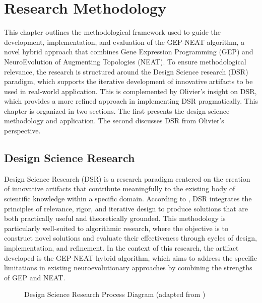 \chapter{Research Methodology}\label{chapter:research_methodology}
This chapter outlines the methodological framework used to guide the development, implementation, and evaluation of the GEP-NEAT algorithm, a novel hybrid approach that combines Gene Expression Programming (GEP) and NeuroEvolution of Augmenting Topologies (NEAT). To ensure methodological relevance, the research is structured around the Design Science research (DSR) paradigm, which supports the iterative development of innovative artifacts to be used in real-world application. This is complemented by Olivier's insight on DSR, which provides a more refined approach in implementing DSR pragmatically. This chapter is organized in two sections. The first presents the design science methodology and application. The second discusses DSR from Olivier's perspective.

\section{Design Science Research}
Design Science Research (DSR) is a research paradigm centered on the creation of innovative artifacts that contribute meaningfully to the existing body of scientific knowledge within a specific domain. According to \cite{hevner2004design}, DSR integrates the principles of relevance, rigor, and iterative design to produce solutions that are both practically useful and theoretically grounded. This methodology is particularly well-suited to algorithmic research, where the objective is to construct novel solutions and evaluate their effectiveness through cycles of design, implementation, and refinement. In the context of this research, the artifact developed is the GEP-NEAT hybrid algorithm, which aims to address the specific limitations in existing neuroevolutionary approaches by combining the strengths of GEP and NEAT.

\parbreak
\begin{figure}[H] %
	\centering %
	\caption{Design Science Research Process Diagram (adapted from \cite{hevner2004design})}
	\label{fig:dsr} %
\end{figure}


